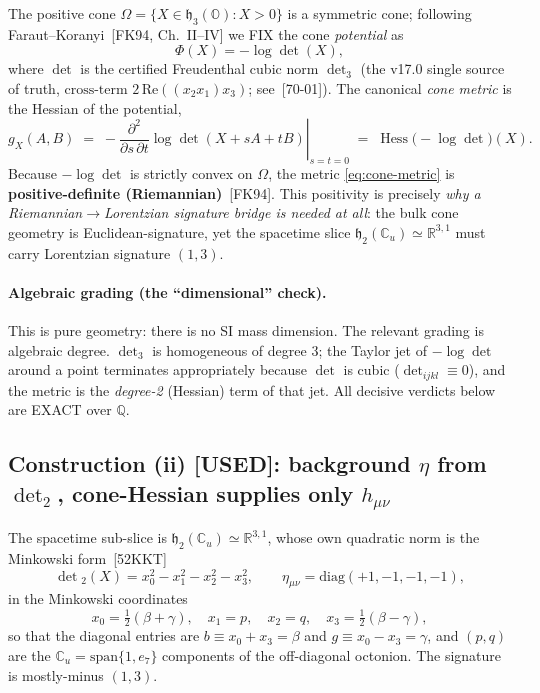 The positive cone $\Omega = \{X \in \mathfrak{h}_3(\mathbb{O}) : X > 0\}$ is a
symmetric cone; following Faraut--Koranyi~[FK94, Ch.~II--IV] we FIX the cone
\emph{potential} as
\begin{equation}
  \Phi(X) = -\log \det(X),
  \label{eq:potential}
\end{equation}
where $\det$ is the certified Freudenthal cubic norm $\det_3$ (the v17.0 single
source of truth, $\text{cross-term } 2\,\mathrm{Re}((x_2 x_1) x_3)$;
see~[70-01]). The canonical \emph{cone metric} is the Hessian of the potential,
\begin{equation}
  g_X(A,B) \;=\; -\left.\frac{\partial^2}{\partial s\,\partial t}
    \log\det(X + sA + tB)\right|_{s=t=0}
  \;=\; \operatorname{Hess}\!\big(-\log\det\big)(X).
  \label{eq:cone-metric}
\end{equation}
Because $-\log\det$ is strictly convex on $\Omega$, the metric
\eqref{eq:cone-metric} is \textbf{positive-definite (Riemannian)}~[FK94]. This
positivity is precisely \emph{why a Riemannian$\to$Lorentzian signature bridge is
needed at all}: the bulk cone geometry is Euclidean-signature, yet the spacetime
slice $\mathfrak{h}_2(\mathbb{C}_u) \simeq \mathbb{R}^{3,1}$ must carry Lorentzian
signature $(1,3)$.

\paragraph{Algebraic grading (the ``dimensional'' check).}
This is pure geometry: there is no SI mass dimension. The relevant grading is
algebraic degree. $\det_3$ is homogeneous of degree $3$; the Taylor jet of
$-\log\det$ around a point terminates appropriately because $\det$ is cubic
($\det_{ijkl} \equiv 0$), and the metric is the \emph{degree-2} (Hessian) term of
that jet. All decisive verdicts below are EXACT over $\mathbb{Q}$.

\subsection{Construction (ii) [USED]: background $\eta$ from $\det_2$,
  cone-Hessian supplies only $h_{\mu\nu}$}

The spacetime sub-slice is $\mathfrak{h}_2(\mathbb{C}_u) \simeq \mathbb{R}^{3,1}$,
whose own quadratic norm is the Minkowski form~[52KKT]
\begin{equation}
  \det{}_2(X) = x_0^2 - x_1^2 - x_2^2 - x_3^2, \qquad
  \eta_{\mu\nu} = \mathrm{diag}(+1,-1,-1,-1),
  \label{eq:det2}
\end{equation}
in the Minkowski coordinates
\begin{equation}
  x_0 = \tfrac{1}{2}(\beta + \gamma), \quad x_1 = p, \quad x_2 = q, \quad
  x_3 = \tfrac{1}{2}(\beta - \gamma),
  \label{eq:mink-coords}
\end{equation}
so that the diagonal entries are $b \equiv x_0 + x_3 = \beta$ and
$g \equiv x_0 - x_3 = \gamma$, and $(p,q)$ are the $\mathbb{C}_u = \mathrm{span}\{1,e_7\}$
components of the off-diagonal octonion. The signature is mostly-minus $(1,3)$.

